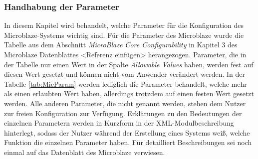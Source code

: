 \subsubsection{Handhabung der Parameter}
In diesem Kapitel wird behandelt, welche Parameter für die Konfiguration des Microblaze-Systems wichtig sind.
Für die Parameter des Microblaze wurde die Tabelle aus dem Abschnitt \textit{MicroBlaze Core Configurability} in Kapitel 3 des Microblaze Datenblattes <Referenz einfügen> herangezogen. Parameter, die in der Tabelle nur einen Wert in der Spalte \textit{Allowable Values} haben, werden fest auf diesen Wert gesetzt und können nicht vom Anwender verändert werden. In der Tabelle \ref{tab:MicParam} werden lediglich die Parameter behandelt, welche mehr als einen erlaubten Wert haben, allerdings trotzdem auf einen festen Wert gesetzt werden. Alle anderen Parameter, die nicht genannt werden, stehen dem Nutzer zur freien Konfiguration zur Verfügung. Erklärungen zu den Bedeutungen der einzelnen Parametern werden in Kurzform in der XML-Modulbeschreibung hinterlegt, sodass der Nutzer während der Erstellung eines Systems weiß, welche Funktion die einzelnen Parameter haben. Für detailliert Beschreibungen sei noch einmal auf das Datenblatt des Microblaze verwiesen. %
